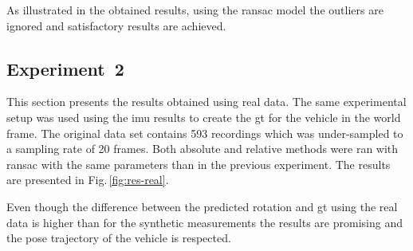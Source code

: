 As illustrated in the obtained results, using the \gls{ransac}
model the outliers are ignored and satisfactory results are achieved.

\subsection{Experiment~2}
\label{sec:exp2}
This section presents the results obtained using real data. The same
experimental setup was used using the \gls{imu} results to create
the \gls{gt} for the vehicle in the world frame.  The original data set
contains 593 recordings which was under-sampled to a sampling rate of 20
frames.  Both absolute and relative methods were ran with \gls{ransac} with the
same parameters than in the previous experiment. The results are presented in
Fig.\,\ref{fig:res-real}.

Even though the difference between the predicted rotation and \gls{gt} using
the real data is higher than for the synthetic measurements the results are
promising and the pose trajectory of the vehicle is respected.










